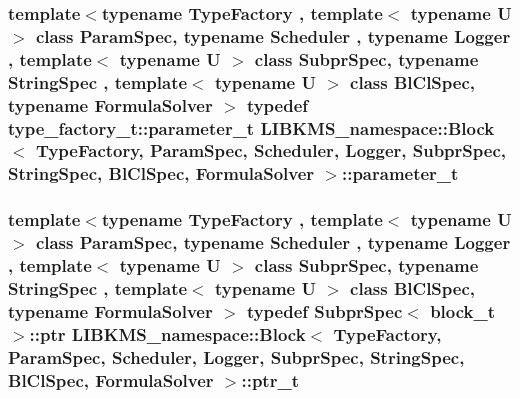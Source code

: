 \hypertarget{classLIBKMS__namespace_1_1Block_aebb850556ee5e8369c1d95caa5dc9c69}{
\subsubsection[{parameter\-\_\-t}]{\setlength{\rightskip}{0pt plus 5cm}template$<$typename Type\-Factory , template$<$ typename U $>$ class Param\-Spec, typename Scheduler , typename Logger , template$<$ typename U $>$ class Subpr\-Spec, typename String\-Spec , template$<$ typename U $>$ class Bl\-Cl\-Spec, typename Formula\-Solver $>$ typedef {\bf type\-\_\-factory\-\_\-t\-::parameter\-\_\-t} {\bf L\-I\-B\-K\-M\-S\-\_\-namespace\-::\-Block}$<$ {\bf Type\-Factory}, Param\-Spec, Scheduler, Logger, Subpr\-Spec, String\-Spec, Bl\-Cl\-Spec, Formula\-Solver $>$\-::{\bf parameter\-\_\-t}}}\label{classLIBKMS__namespace_1_1Block_aebb850556ee5e8369c1d95caa5dc9c69}
\hypertarget{classLIBKMS__namespace_1_1Block_a85039a495a9c40a4425de6a5291decbe}{
\subsubsection[{ptr\-\_\-t}]{\setlength{\rightskip}{0pt plus 5cm}template$<$typename Type\-Factory , template$<$ typename U $>$ class Param\-Spec, typename Scheduler , typename Logger , template$<$ typename U $>$ class Subpr\-Spec, typename String\-Spec , template$<$ typename U $>$ class Bl\-Cl\-Spec, typename Formula\-Solver $>$ typedef Subpr\-Spec$<$ {\bf block\-\_\-t} $>$\-::ptr {\bf L\-I\-B\-K\-M\-S\-\_\-namespace\-::\-Block}$<$ {\bf Type\-Factory}, Param\-Spec, Scheduler, Logger, Subpr\-Spec, String\-Spec, Bl\-Cl\-Spec, Formula\-Solver $>$\-::{\bf ptr\-\_\-t}}}\label{classLIBKMS__namespace_1_1Block_a85039a495a9c40a4425de6a5291decbe}
